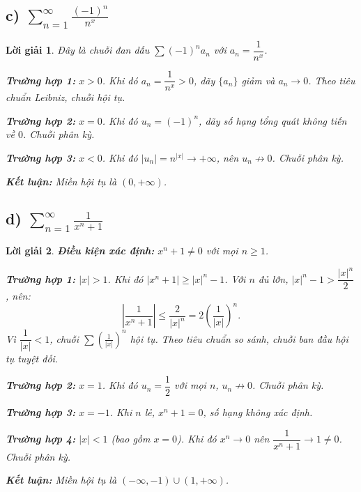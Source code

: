 \documentclass[12pt,a4paper]{article}
\newtheorem*{solution}{Lời giải}
\begin{document}
\subsection*{c) $\displaystyle\sum_{n=1}^{\infty}\frac{(-1)^{n}}{n^{x}}$}

\begin{solution}
Đây là chuỗi đan dấu $\sum (-1)^n a_n$ với $a_n = \dfrac{1}{n^x}$.

\textbf{Trường hợp 1:} $x > 0$. Khi đó $a_n = \dfrac{1}{n^x} > 0$, dãy $\{a_n\}$ giảm và $a_n \to 0$. Theo tiêu chuẩn Leibniz, chuỗi hội tụ.

\textbf{Trường hợp 2:} $x = 0$. Khi đó $u_n = (-1)^n$, dãy số hạng tổng quát không tiến về $0$. Chuỗi phân kỳ.

\textbf{Trường hợp 3:} $x < 0$. Khi đó $|u_n| = n^{|x|} \to +\infty$, nên $u_n \not\to 0$. Chuỗi phân kỳ.

\textbf{Kết luận:} Miền hội tụ là $\boxed{(0, +\infty)}$.
\end{solution}

\subsection*{d) $\displaystyle\sum_{n=1}^{\infty}\frac{1}{x^{n}+1}$}

\begin{solution}
\textbf{Điều kiện xác định:} $x^n + 1 \neq 0$ với mọi $n \geq 1$.

\textbf{Trường hợp 1:} $|x| > 1$. Khi đó $|x^n + 1| \geq |x|^n - 1$. Với $n$ đủ lớn, $|x|^n - 1 > \dfrac{|x|^n}{2}$, nên:
\[
\left|\frac{1}{x^n + 1}\right| \leq \frac{2}{|x|^n} = 2\left(\frac{1}{|x|}\right)^n.
\]
Vì $\dfrac{1}{|x|} < 1$, chuỗi $\sum \left(\frac{1}{|x|}\right)^n$ hội tụ. Theo tiêu chuẩn so sánh, chuỗi ban đầu hội tụ tuyệt đối.

\textbf{Trường hợp 2:} $x = 1$. Khi đó $u_n = \dfrac{1}{2}$ với mọi $n$, $u_n \not\to 0$. Chuỗi phân kỳ.

\textbf{Trường hợp 3:} $x = -1$. Khi $n$ lẻ, $x^n + 1 = 0$, số hạng không xác định.

\textbf{Trường hợp 4:} $|x| < 1$ (bao gồm $x = 0$). Khi đó $x^n \to 0$ nên $\dfrac{1}{x^n + 1} \to 1 \neq 0$. Chuỗi phân kỳ.

\textbf{Kết luận:} Miền hội tụ là $\boxed{(-\infty, -1) \cup (1, +\infty)}$.
\end{solution}
\end{document}

